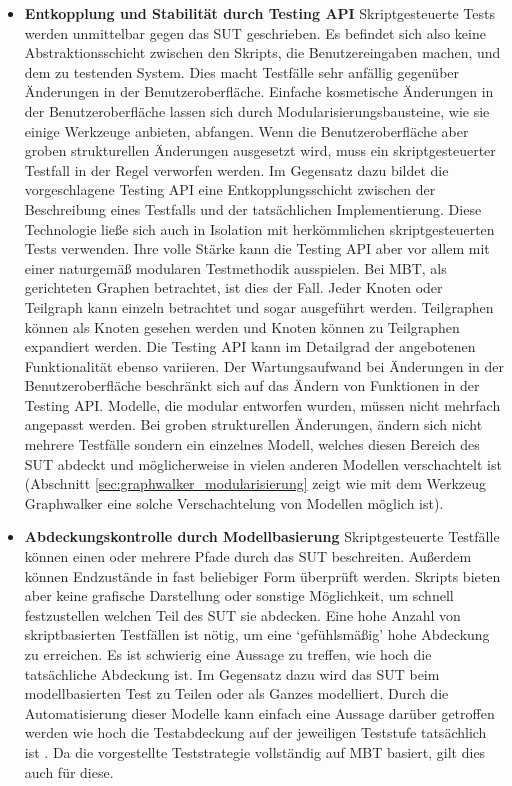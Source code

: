 \begin{itemize}
\item \textbf{Entkopplung und Stabilität durch Testing API}  Skriptgesteuerte Tests werden unmittelbar gegen das \Gls{SUT} geschrieben. Es befindet sich also keine Abstraktionsschicht zwischen den Skripts, die Benutzereingaben machen, und dem zu testenden System. Dies macht Testfälle sehr anfällig gegenüber Änderungen in der Benutzeroberfläche. Einfache kosmetische Änderungen in der Benutzeroberfläche lassen sich durch Modularisierungsbausteine, wie sie einige Werkzeuge anbieten, abfangen. Wenn die Benutzeroberfläche aber groben strukturellen Änderungen ausgesetzt wird, muss ein skriptgesteuerter Testfall in der Regel verworfen werden. Im Gegensatz dazu bildet die vorgeschlagene Testing API eine Entkopplungsschicht zwischen der Beschreibung eines Testfalls und der tatsächlichen Implementierung. Diese Technologie ließe sich auch in Isolation mit herkömmlichen skriptgesteuerten Tests verwenden. Ihre volle Stärke kann die Testing API aber vor allem mit einer naturgemäß modularen Testmethodik ausspielen. Bei \Gls{MBT}, als gerichteten Graphen betrachtet, ist dies der Fall. Jeder Knoten oder Teilgraph kann einzeln betrachtet und sogar ausgeführt werden. Teilgraphen können als Knoten gesehen werden und Knoten können zu Teilgraphen expandiert werden. Die Testing API kann im Detailgrad der angebotenen Funktionalität ebenso variieren. Der Wartungsaufwand bei Änderungen in der Benutzeroberfläche beschränkt sich auf das Ändern von Funktionen in der Testing API. Modelle, die modular entworfen wurden, müssen nicht mehrfach angepasst werden. Bei groben strukturellen Änderungen, ändern sich nicht mehrere Testfälle sondern ein einzelnes Modell, welches diesen Bereich des \Gls{SUT} abdeckt und möglicherweise in vielen anderen Modellen verschachtelt ist (Abschnitt \ref{sec:graphwalker_modularisierung} zeigt wie mit dem Werkzeug Graphwalker eine solche Verschachtelung von Modellen möglich ist).

\item \textbf{Abdeckungskontrolle durch Modellbasierung} Skriptgesteuerte Testfälle können einen oder mehrere Pfade durch das \Gls{SUT} beschreiten. Außerdem können Endzustände in fast beliebiger Form überprüft werden. Skripts bieten aber keine grafische Darstellung oder sonstige Möglichkeit, um schnell festzustellen welchen Teil des \Gls{SUT} sie abdecken. Eine hohe Anzahl von skriptbasierten Testfällen ist nötig, um eine `gefühlsmäßig' hohe Abdeckung zu erreichen. Es ist schwierig eine Aussage zu treffen, wie hoch die tatsächliche Abdeckung ist. Im Gegensatz dazu wird das \Gls{SUT} beim modellbasierten Test zu Teilen oder als Ganzes modelliert. Durch die Automatisierung dieser Modelle kann einfach eine Aussage darüber getroffen werden wie hoch die Testabdeckung auf der jeweiligen Teststufe tatsächlich ist \cite{utting_practical_2007}. Da die vorgestellte Teststrategie vollständig auf \Gls{MBT} basiert, gilt dies auch für diese. 


\end{itemize}
